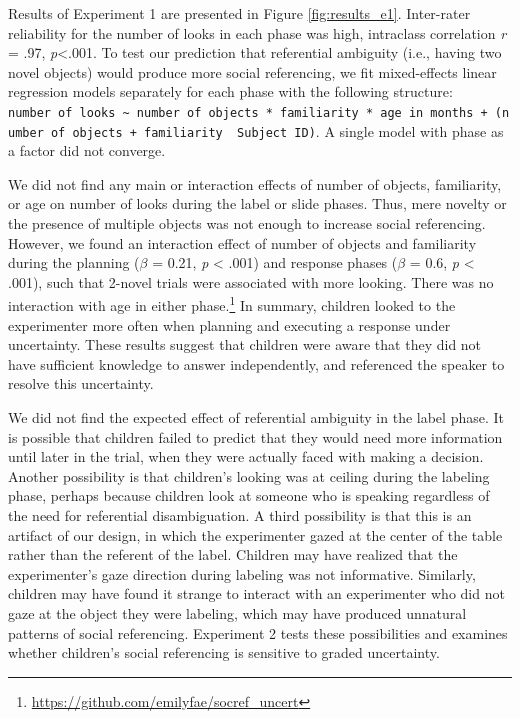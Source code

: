 \documentclass[10pt, letterpaper]{article}
\begin{document}
Results of Experiment 1 are presented in Figure \ref{fig:results_e1}.
Inter-rater reliability for the number of looks in each phase was high,
intraclass correlation \emph{r} = .97, \emph{p}\textless{}.001. To test
our prediction that referential ambiguity (i.e., having two novel
objects) would produce more social referencing, we fit mixed-effects
linear regression models separately for each phase with the following
structure:
\texttt{number\ of\ looks\ \textasciitilde{}\ number\ of\ objects\ *\ familiarity\ *\ age\ in\ months\ +\ (number\ of\ objects\ +\ familiarity\ \textbar{}\ Subject\ ID)}.
A single model with phase as a factor did not converge.

We did not find any main or interaction effects of number of objects,
familiarity, or age on number of looks during the label or slide phases.
Thus, mere novelty or the presence of multiple objects was not enough to
increase social referencing. However, we found an interaction effect of
number of objects and familiarity during the planning (\(\beta\) = 0.21,
\emph{p} \textless{} .001) and response phases (\(\beta\) = 0.6,
\emph{p} \textless{} .001), such that 2-novel trials were associated
with more looking. There was no interaction with age in either
phase.\footnote{\url{https://github.com/emilyfae/socref_uncert}} In
summary, children looked to the experimenter more often when planning
and executing a response under uncertainty. These results suggest that
children were aware that they did not have sufficient knowledge to
answer independently, and referenced the speaker to resolve this
uncertainty.

We did not find the expected effect of referential ambiguity in the
label phase. It is possible that children failed to predict that they
would need more information until later in the trial, when they were
actually faced with making a decision. Another possibility is that
children's looking was at ceiling during the labeling phase, perhaps
because children look at someone who is speaking regardless of the need
for referential disambiguation. A third possibility is that this is an
artifact of our design, in which the experimenter gazed at the center of
the table rather than the referent of the label. Children may have
realized that the experimenter's gaze direction during labeling was not
informative. Similarly, children may have found it strange to interact
with an experimenter who did not gaze at the object they were labeling,
which may have produced unnatural patterns of social referencing.
Experiment 2 tests these possibilities and examines whether children's
social referencing is sensitive to graded uncertainty.
\end{document}
